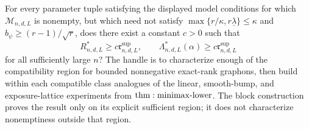 For every parameter tuple satisfying the displayed model conditions for which \(\mathcal M_{n,d,L}\) is nonempty, but which need not satisfy \(\max\{r/\kappa,r\underline\lambda\}\leq\kappa\) and \(b_\psi\geq(r-1)/\sqrt r\), does there exist a constant \(c>0\) such that
\[
 R^*_{n,d,L}\geq c\mathfrak r^{\mathrm{sup}}_{n,d,L},
 \qquad
 \Lambda^*_{n,d,L}(\alpha)\geq c\mathfrak r^{\mathrm{sup}}_{n,d,L}
\]
for all sufficiently large \(n\)?  The handle is to characterize enough of the compatibility region for bounded nonnegative exact-rank graphons, then build within each compatible class analogues of the linear, smooth-bump, and exposure-lattice experiments from \({\rm thm:minimax\text{-}lower}\).  The block construction proves the result only on its explicit sufficient region; it does not characterize nonemptiness outside that region.